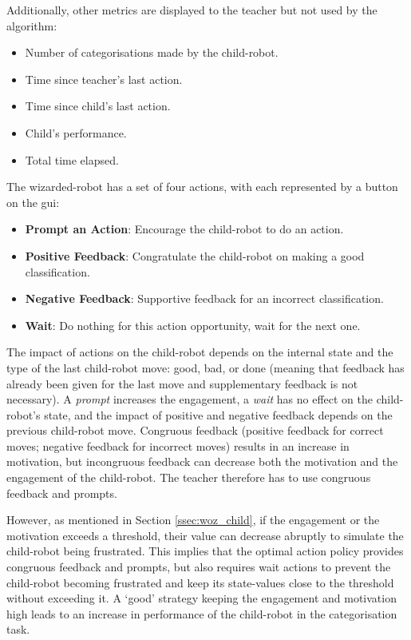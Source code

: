 Additionally, other metrics are displayed to the teacher but not used by the algorithm:
\begin{itemize}
	\item Number of categorisations made by the child-robot.
	\item Time since teacher's last action.
	\item Time since child's last action.
	\item Child's performance.
	\item Total time elapsed.
\end{itemize}


The wizarded-robot has a set of four actions, with each represented by a button on the \gls{gui}: 
\begin{itemize}
	\item \textbf{Prompt an Action}: Encourage the child-robot to do an action.
	\item \textbf{Positive Feedback}: Congratulate the child-robot on making a good classification.
	\item \textbf{Negative Feedback}: Supportive feedback for an incorrect classification.
	\item \textbf{Wait}: Do nothing for this action opportunity, wait for the next one.
\end{itemize}


The impact of actions on the child-robot depends on the internal state and the type of the last child-robot move: good, bad, or done (meaning that feedback has already been given for the last move and supplementary feedback is not necessary). A \textit{prompt} increases the engagement, a \textit{wait} has no effect on the child-robot's state, and the impact of positive and negative feedback depends on the previous child-robot move. Congruous feedback (positive feedback for correct moves; negative feedback for incorrect moves) results in an increase in motivation, but incongruous feedback can decrease both the motivation and the engagement of the child-robot. The teacher therefore has to use congruous feedback and prompts.

However, as mentioned in Section \ref{ssec:woz_child}, if the engagement or the motivation exceeds a threshold, their value can decrease abruptly to simulate the child-robot being frustrated. This implies that the optimal action policy provides congruous feedback and prompts, but also requires wait actions to prevent the child-robot becoming frustrated and keep its state-values close to the threshold without exceeding it. A `good' strategy keeping the engagement and motivation high leads to an increase in performance of the child-robot in the categorisation task.

